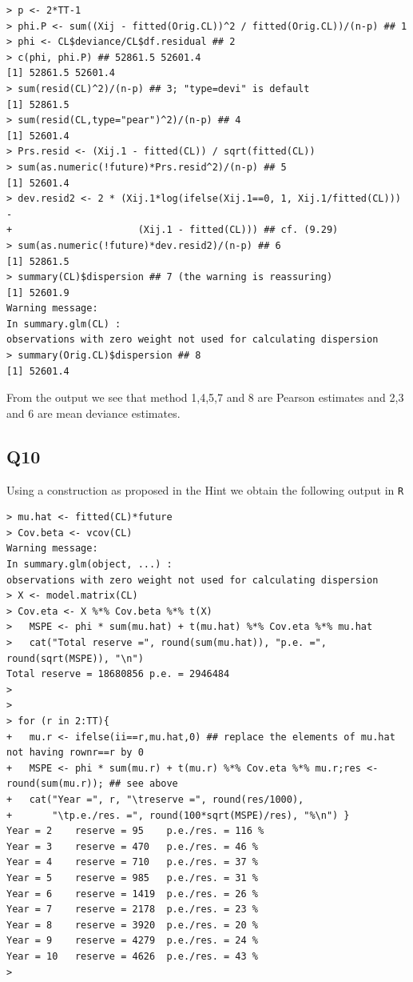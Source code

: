 \documentclass[11pt]{article}
\begin{document}
\begin{verbatim}
> p <- 2*TT-1
> phi.P <- sum((Xij - fitted(Orig.CL))^2 / fitted(Orig.CL))/(n-p) ## 1
> phi <- CL$deviance/CL$df.residual ## 2
> c(phi, phi.P) ## 52861.5 52601.4
[1] 52861.5 52601.4
> sum(resid(CL)^2)/(n-p) ## 3; "type=devi" is default
[1] 52861.5
> sum(resid(CL,type="pear")^2)/(n-p) ## 4
[1] 52601.4
> Prs.resid <- (Xij.1 - fitted(CL)) / sqrt(fitted(CL))
> sum(as.numeric(!future)*Prs.resid^2)/(n-p) ## 5
[1] 52601.4
> dev.resid2 <- 2 * (Xij.1*log(ifelse(Xij.1==0, 1, Xij.1/fitted(CL))) -
+                      (Xij.1 - fitted(CL))) ## cf. (9.29)
> sum(as.numeric(!future)*dev.resid2)/(n-p) ## 6
[1] 52861.5
> summary(CL)$dispersion ## 7 (the warning is reassuring)
[1] 52601.9
Warning message:
In summary.glm(CL) :
observations with zero weight not used for calculating dispersion
> summary(Orig.CL)$dispersion ## 8
[1] 52601.4

\end{verbatim}

From the output we see that method 1,4,5,7 and 8 are Pearson estimates and 2,3 and 6 are mean deviance estimates.

\subsection*{Q10}
Using a construction as proposed in the Hint we obtain the following output in \verb|R|

\begin{verbatim}
> mu.hat <- fitted(CL)*future
> Cov.beta <- vcov(CL)
Warning message:
In summary.glm(object, ...) :
observations with zero weight not used for calculating dispersion
> X <- model.matrix(CL)
> Cov.eta <- X %*% Cov.beta %*% t(X)
>   MSPE <- phi * sum(mu.hat) + t(mu.hat) %*% Cov.eta %*% mu.hat
>   cat("Total reserve =", round(sum(mu.hat)), "p.e. =", round(sqrt(MSPE)), "\n")
Total reserve = 18680856 p.e. = 2946484 
>   
>   
> for (r in 2:TT){
+   mu.r <- ifelse(ii==r,mu.hat,0) ## replace the elements of mu.hat not having rownr==r by 0
+   MSPE <- phi * sum(mu.r) + t(mu.r) %*% Cov.eta %*% mu.r;res <- round(sum(mu.r)); ## see above
+   cat("Year =", r, "\treserve =", round(res/1000),
+       "\tp.e./res. =", round(100*sqrt(MSPE)/res), "%\n") }
Year = 2 	reserve = 95 	p.e./res. = 116 %
Year = 3 	reserve = 470 	p.e./res. = 46 %
Year = 4 	reserve = 710 	p.e./res. = 37 %
Year = 5 	reserve = 985 	p.e./res. = 31 %
Year = 6 	reserve = 1419 	p.e./res. = 26 %
Year = 7 	reserve = 2178 	p.e./res. = 23 %
Year = 8 	reserve = 3920 	p.e./res. = 20 %
Year = 9 	reserve = 4279 	p.e./res. = 24 %
Year = 10 	reserve = 4626 	p.e./res. = 43 %
>
\end{verbatim}
\end{document}
